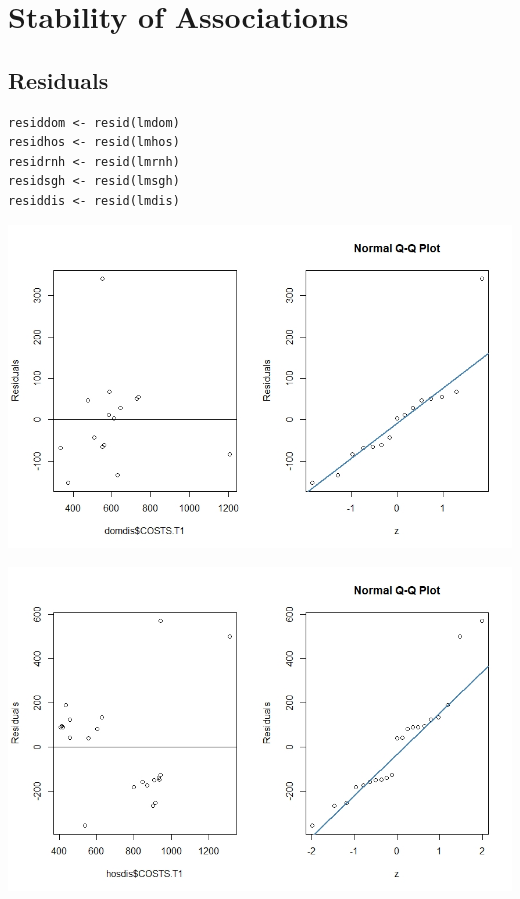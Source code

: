 \documentclass[]{article}
\begin{document}


\section{Stability of Associations}
\subsection{Residuals}

\begin{lstlisting}
residdom <- resid(lmdom)
residhos <- resid(lmhos)
residrnh <- resid(lmrnh)
residsgh <- resid(lmsgh)
residdis <- resid(lmdis)
\end{lstlisting}


\centering
\includegraphics[width=\textwidth]{RStudio/jpeg/Res_DOM.jpeg}
\raggedright


\centering
\includegraphics[width=\textwidth]{RStudio/jpeg/Res_HOS.jpeg}
\raggedright
\end{document}

